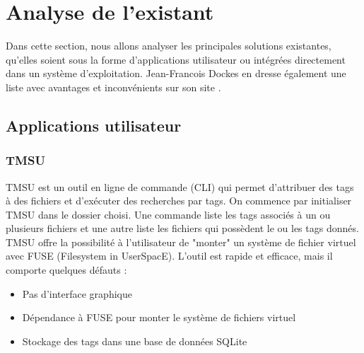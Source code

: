 \documentclass[a4paper, 12pt]{article}
\begin{document}
\section{Analyse de l'existant} %
Dans cette section, nous allons analyser les principales solutions existantes, qu'elles soient 
sous la forme d'applications utilisateur ou intégrées directement dans un système d'exploitation.
Jean-Francois Dockes en dresse également une liste avec avantages et inconvénients sur son site 
\cite{ref3}.

\subsection{Applications utilisateur}
\subsubsection{TMSU}
TMSU \cite{ref15} est un outil en ligne de commande (CLI) qui permet d'attribuer des tags à des 
fichiers et d'exécuter des recherches par tags. On commence par initialiser TMSU dans le dossier choisi. 
Une commande liste les tags associés à un ou 
plusieurs fichiers et une autre liste les fichiers qui possèdent le ou les tags donnés. TMSU offre 
la possibilité à l'utilisateur de "monter" un système de fichier virtuel avec FUSE (Filesystem in 
UserSpacE). L'outil est rapide et efficace, mais il comporte quelques défauts :
\begin{itemize}
    \item Pas d'interface graphique
    \item Dépendance à FUSE pour monter le système de fichiers virtuel
    \item Stockage des tags dans une base de données SQLite
\end{itemize}
\end{document}
